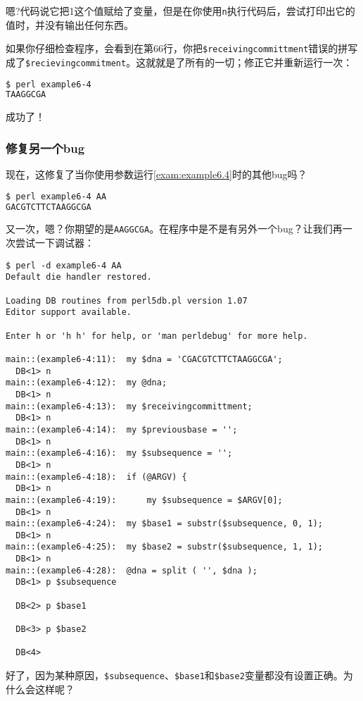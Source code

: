 嗯?代码说它把1这个值赋给了变量，但是在你使用\verb|n|执行代码后，尝试打印出它的值时，并没有输出任何东西。

如果你仔细检查程序，会看到在第66行，你把\verb|$receivingcommittment|错误的拼写成了\verb|$recievingcommitment|。这就就是了所有的一切；修正它并重新运行一次：

\begin{lstlisting}[language=bash]
$ perl example6-4
TAAGGCGA 
\end{lstlisting}

成功了！

\subsubsection{修复另一个bug}
现在，这修复了当你使用参数运行\autoref{exam:example6.4}时的其他bug吗？

\begin{lstlisting}[language=bash]
$ perl example6-4 AA
GACGTCTTCTAAGGCGA
\end{lstlisting}

又一次，嗯？你期望的是\verb|AAGGCGA|。在程序中是不是有另外一个bug？让我们再一次尝试一下调试器：

\begin{lstlisting}
$ perl -d example6-4 AA
Default die handler restored.

Loading DB routines from perl5db.pl version 1.07
Editor support available.

Enter h or 'h h' for help, or 'man perldebug' for more help.

main::(example6-4:11):	my $dna = 'CGACGTCTTCTAAGGCGA';
  DB<1> n
main::(example6-4:12):	my @dna;
  DB<1> n
main::(example6-4:13):	my $receivingcommittment;
  DB<1> n
main::(example6-4:14):	my $previousbase = ''; 
  DB<1> n
main::(example6-4:16):	my $subsequence = '';
  DB<1> n
main::(example6-4:18):	if (@ARGV) {
  DB<1> n
main::(example6-4:19):	    my $subsequence = $ARGV[0];
  DB<1> n
main::(example6-4:24):	my $base1 = substr($subsequence, 0, 1);
  DB<1> n
main::(example6-4:25):	my $base2 = substr($subsequence, 1, 1);
  DB<1> n
main::(example6-4:28):	@dna = split ( '', $dna );
  DB<1> p $subsequence

  DB<2> p $base1

  DB<3> p $base2

  DB<4> 
\end{lstlisting}

好了，因为某种原因，\verb|$subsequence|、\verb|$base1|和\verb|$base2|变量都没有设置正确。为什么会这样呢？

